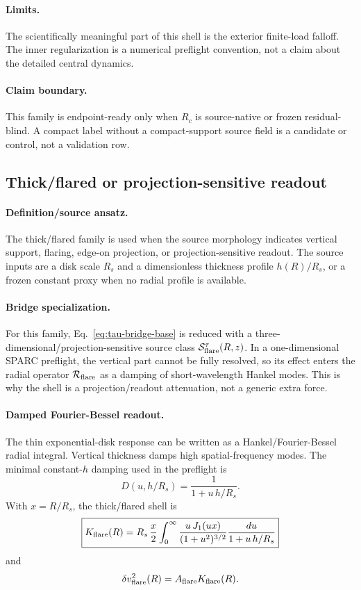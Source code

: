 \documentclass[11pt]{article}
\begin{document}
\paragraph{Limits.}
The scientifically meaningful part of this shell is the exterior finite-load
falloff.  The inner regularization is a numerical preflight convention, not a
claim about the detailed central dynamics.

\paragraph{Claim boundary.}
This family is endpoint-ready only when \(R_c\) is source-native or frozen
residual-blind.  A compact label without a compact-support source field is a
candidate or control, not a validation row.

\subsection{Thick/flared or projection-sensitive readout}

\paragraph{Definition/source ansatz.}
The thick/flared family is used when the source morphology indicates vertical
support, flaring, edge-on projection, or projection-sensitive readout.  The
source inputs are a disk scale \(R_s\) and a dimensionless thickness profile
\(h(R)/R_s\), or a frozen constant proxy when no radial profile is available.

\paragraph{Bridge specialization.}
For this family, Eq.~\eqref{eq:tau-bridge-base} is reduced with a
three-dimensional/projection-sensitive source class
\(\mathcal S_{\rm flare}^\tau(R,z)\).  In a one-dimensional SPARC preflight,
the vertical part cannot be fully resolved, so its effect enters the radial
operator \(\mathcal R_{\rm flare}\) as a damping of short-wavelength Hankel
modes.  This is why the shell is a projection/readout attenuation, not a
generic extra force.

\paragraph{Damped Fourier-Bessel readout.}
The thin exponential-disk response can be written as a Hankel/Fourier-Bessel
radial integral.  Vertical thickness damps high spatial-frequency modes.  The
minimal constant-\(h\) damping used in the preflight is
\[
D(u,h/R_s)=\frac{1}{1+u\,h/R_s}.
\]
With \(x=R/R_s\), the thick/flared shell is
\[
\boxed{
K_{\rm flare}(R)
=
R_s\,\frac{x}{2}
\int_0^\infty
\frac{u\,J_1(ux)}{(1+u^2)^{3/2}}
\frac{du}{1+u\,h/R_s}
}
\]
and
\[
\delta v_{\rm flare}^2(R)=A_{\rm flare}K_{\rm flare}(R).
\]
\end{document}
